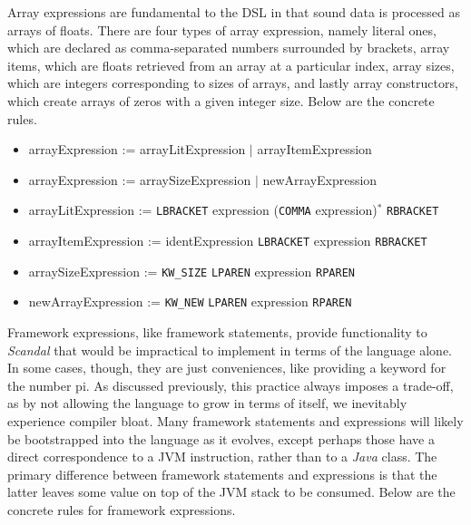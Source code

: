 Array expressions are fundamental to the DSL in that sound data is processed as arrays of floats. There are four types of array expression, namely literal ones, which are declared as comma-separated numbers surrounded by brackets, array items, which are floats retrieved from an array at a particular index, array sizes, which are integers corresponding to sizes of arrays, and lastly array constructors, which create arrays of zeros with a given integer size. Below are the concrete rules.

\begin{itemize}
	\item arrayExpression := arrayLitExpression $|$ arrayItemExpression
	\item arrayExpression := arraySizeExpression $|$ newArrayExpression
	\item arrayLitExpression := \texttt{LBRACKET} expression (\texttt{COMMA} expression)$^*$ \texttt{RBRACKET}
	\item arrayItemExpression := identExpression \texttt{LBRACKET} expression \texttt{RBRACKET}
	\item arraySizeExpression := \texttt{KW\_SIZE} \texttt{LPAREN} expression \texttt{RPAREN}
	\item newArrayExpression := \texttt{KW\_NEW} \texttt{LPAREN} expression \texttt{RPAREN}
\end{itemize}

Framework expressions, like framework statements, provide functionality to \emph{Scandal} that would be impractical to implement in terms of the language alone. In some cases, though, they are just conveniences, like providing a keyword for the number pi. As discussed previously, this practice always imposes a trade-off, as by not allowing the language to grow in terms of itself, we inevitably experience compiler bloat. Many framework statements and expressions will likely be bootstrapped into the language as it evolves, except perhaps those have a direct correspondence to a JVM instruction, rather than to a \emph{Java} class. The primary difference between framework statements and expressions is that the latter leaves some value on top of the JVM stack to be consumed. Below are the concrete rules for framework expressions.

